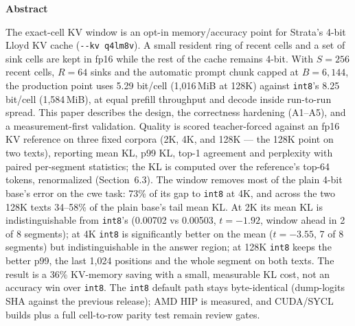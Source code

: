 \documentclass[10pt,twocolumn]{article}
\begin{document}

\noindent\textbf{Abstract}\par
\vspace{0.6ex}
\noindent
The exact-cell KV window is an opt-in memory/accuracy point for Strata's 4-bit Lloyd KV cache (\texttt{-{}-kv q4lm8v}). A small resident ring of recent cells and a set of sink cells are kept in fp16 while the rest of the cache remains 4-bit. With $S{=}256$ recent cells, $R{=}64$ sinks and the automatic prompt chunk capped at $B{=}6{,}144$, the production point uses 5.29 bit/cell (1,016\,MiB at 128K) against \texttt{int8}'s 8.25 bit/cell (1,584\,MiB), at equal prefill throughput and decode inside run-to-run spread. This paper describes the design, the correctness hardening (A1--A5), and a measurement-first validation. Quality is scored teacher-forced against an fp16 KV reference on three fixed corpora (2K, 4K, and 128K --- the 128K point on two texts), reporting mean KL, p99 KL, top-1 agreement and perplexity with paired per-segment statistics; the KL is computed over the reference's top-64 tokens, renormalized (Section~6.3). The window removes most of the plain 4-bit base's error on the cwe task: 73\% of its gap to \texttt{int8} at 4K, and across the two 128K texts 34--58\% of the plain base's tail mean KL. At 2K its mean KL is indistinguishable from \texttt{int8}'s (0.00702 vs 0.00503, $t=-1.92$, window ahead in 2 of 8 segments); at 4K \texttt{int8} is significantly better on the mean ($t=-3.55$, 7 of 8 segments) but indistinguishable in the answer region; at 128K \texttt{int8} keeps the better p99, the last 1,024 positions and the whole segment on both texts. The result is a 36\% KV-memory saving with a small, measurable KL cost, not an accuracy win over \texttt{int8}. The \texttt{int8} default path stays byte-identical (dump-logits SHA against the previous release); AMD HIP is measured, and CUDA/SYCL builds plus a full cell-to-row parity test remain review gates.
\par\medskip
\end{document}
